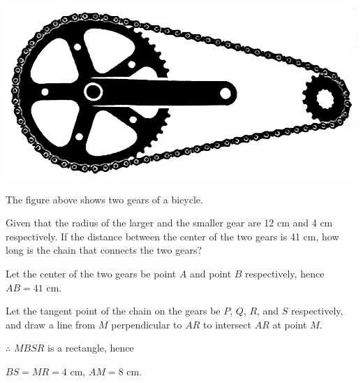 \documentclass{report}
\begin{document}
\begin{question}
	\begin{center}
		\includegraphics[scale=0.14]{assets/8-22.png}
	\end{center}
	\noindent The figure above shows two gears of a bicycle.
	
	\noindent Given that the radius of the larger and the smaller gear are 12 cm and 4 cm respectively. If the distance between the center of the two gears is 41 cm, how long is the chain that connects the two gears?
	
	\sol{}
	
	\begin{vwcol}[widths={0.6,0.4},rule=0pt,sep=1em]
		\noindent Let the center of the two gears be point $A$ and point $B$ respectively, hence $AB = 41$ cm.
		    
		\noindent Let the tangent point of the chain on the gears be $P$, $Q$, $R$, and $S$ respectively, and draw a line from $M$ perpendicular to $AR$ to intersect $AR$ at point $M$.
		    
		\noindent $\therefore$ $MBSR$ is a rectangle, hence 
		    
		$BS = MR = 4$ cm, $AM = 8$ cm.
		

\end{vwcol}
\end{question}
\end{document}
